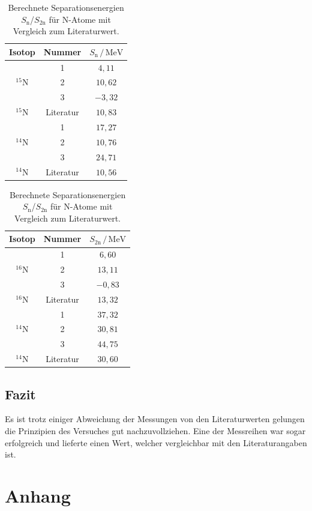 \documentclass[numbers=noenddot,a4paper,notitlepage,twoside,BCOR15mm]{scrartcl}
\begin{document}
	\begin{table}[h]
		\centering
		\caption{Berechnete Separationsenergien $S_\mathrm{n}$/$S_\mathrm{2n}$ für N-Atome mit Vergleich zum Literaturwert.}
		\begin{tabular}{c c|c} 
			Isotop & Nummer & $S_\mathrm{n}\,/\,\mathrm{MeV}$ \\ \hline
			& 1 & $4,11$ \\
			$^{15}$N & 2 & $10,62$ \\
			& 3 & $-3,32$ \\ \hline
			$^{15}$N & Literatur & $10,83$ \\ \hline
			& 1 & $17,27$ \\
			$^{14}$N & 2 & $10,76$ \\
			& 3 & $24,71$ \\ \hline
			$^{14}$N & Literatur & $10,56$ \\ \hline
		\end{tabular}
		\quad
		\begin{tabular}{c c|c} 
			Isotop & Nummer & $S_\mathrm{2n}\,/\,\mathrm{MeV}$ \\ \hline
			& 1 & $6,60$ \\
			$^{16}$N & 2 & $13,11$ \\
			& 3 & $-0,83$ \\ \hline
			$^{16}$N & Literatur & $13,32$ \\ \hline
			& 1 & $37,32$ \\
			$^{14}$N & 2 & $30,81$ \\
			& 3 & $44,75$ \\ \hline
			$^{14}$N & Literatur & $30,60$ \\ \hline
		\end{tabular}
		\label{tab:sep}
	\end{table}
	
	\subsection{Fazit}
	
	Es ist trotz einiger Abweichung der Messungen von den Literaturwerten gelungen die Prinzipien des Versuches gut nachzuvollziehen. Eine der Messreihen war sogar erfolgreich und lieferte einen Wert, welcher vergleichbar mit den Literaturangaben ist.

	\clearpage
	\section{Anhang}
\end{document}
